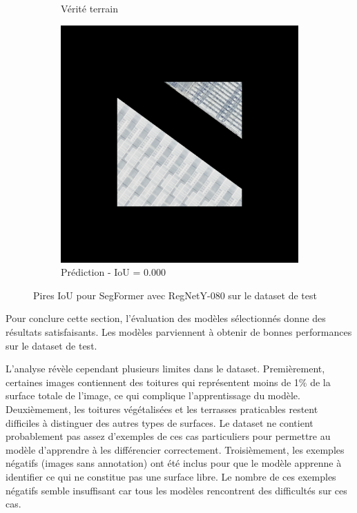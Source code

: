 \begin{figure}[H]
\begin{subfigure}{0.32\textwidth}
    \caption{Vérité terrain}
\end{subfigure}
\hfill
\begin{subfigure}{0.32\textwidth}
    \includegraphics[width=\textwidth]{02-main//figures/ch4/kfold_ensembles/segformer_tu-regnety_080.ra3_in1k/worst_cases/worst_1_iou0.000_24931113_tile_19_19_52ccbb_overlay_pred.png}
    \caption{Prédiction - IoU = 0.000}
\end{subfigure}

\caption{Pires IoU pour SegFormer avec RegNetY-080 sur le dataset de test}
\label{fig:segformer_regnety_080_worst_cases}
\end{figure}

Pour conclure cette section, l'évaluation des modèles sélectionnés donne des résultats satisfaisants. Les modèles parviennent à obtenir de bonnes performances sur le dataset de test.

L'analyse révèle cependant plusieurs limites dans le dataset. Premièrement, certaines images contiennent des toitures qui représentent moins de 1\% de la surface totale de l'image, ce qui complique l'apprentissage du modèle. Deuxièmement, les toitures végétalisées et les terrasses praticables restent difficiles à distinguer des autres types de surfaces. Le dataset ne contient probablement pas assez d'exemples de ces cas particuliers pour permettre au modèle d'apprendre à les différencier correctement. Troisièmement, les exemples négatifs (images sans annotation) ont été inclus pour que le modèle apprenne à identifier ce qui ne constitue pas une surface libre. Le nombre de ces exemples négatifs semble insuffisant car tous les modèles rencontrent des difficultés sur ces cas.

